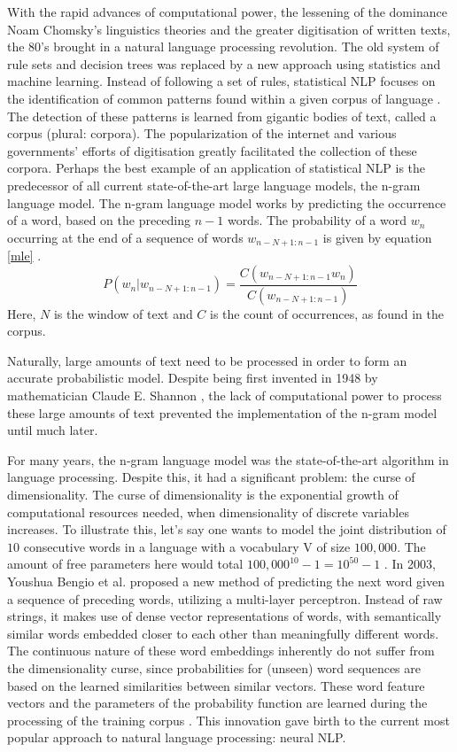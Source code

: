 \documentclass[twoside]{uva-inf-bachelor-thesis}
\begin{document}
With the rapid advances of computational power, the lessening of the dominance Noam Chomsky's linguistics theories and the greater digitisation of written texts, the 80's brought in a natural language processing revolution. The old system of rule sets and decision trees was replaced by a new approach using statistics and machine learning. Instead of following a set of rules, statistical NLP focuses on the identification of common patterns found within a given corpus of language \cite{Manning99}. The detection of these patterns is learned from gigantic bodies of text, called a corpus (plural: corpora). The popularization of the internet and various governments' efforts of digitisation greatly facilitated the collection of these corpora. 
Perhaps the best example of an application of statistical NLP is the predecessor of all current state-of-the-art large language models, the n-gram language model. The n-gram language model works by predicting the occurrence of a word, based on the preceding $n-1$ words. The probability of a word $w_n$ occurring at the end of a sequence of words $w_{n-N+1 : n-1}$ is given by equation \ref{mle} \cite{brown92, Manning99}.
\begin{equation} \label{mle}
    P(w_{n} | w_{n-N+1 : n-1}) = \frac{C(w_{n-N+1 : n-1} w_{n})}{C(w_{n-N+1 : n-1})}
\end{equation}
Here, $N$ is the window of text and $C$ is the count of occurrences, as found in the corpus. 

Naturally, large amounts of text need to be processed in order to form an accurate probabilistic model. Despite being first invented in 1948 by mathematician Claude E. Shannon \cite{shannon48}, the lack of computational power to process these large amounts of text prevented the implementation of the n-gram model until much later.


For many years, the n-gram language model was the state-of-the-art algorithm in language processing. Despite this, it had a significant problem: the curse of dimensionality. The curse of dimensionality is the exponential growth of computational resources needed, when dimensionality of discrete variables increases. To illustrate this, let's say one wants to model the joint distribution of $10$ consecutive words in a language with a vocabulary V of size $100,000$. The amount of free parameters here would total $100,000^{10}-1 = 10^{50}-1$ \cite{bengio03}. 
In 2003, Youshua Bengio et al. proposed a new method of predicting the next word given a sequence of preceding words, utilizing a multi-layer perceptron. Instead of raw strings, it makes use of dense vector representations of words, with semantically similar words embedded closer to each other than meaningfully different words. The continuous nature of these word embeddings inherently do not suffer from the dimensionality curse, since probabilities for (unseen) word sequences are based on the learned similarities between similar vectors. These word feature vectors and the parameters of the probability function are learned during the processing of the training corpus \cite{bengio03}. This innovation gave birth to the current most popular approach to natural language processing: neural NLP.
\end{document}
